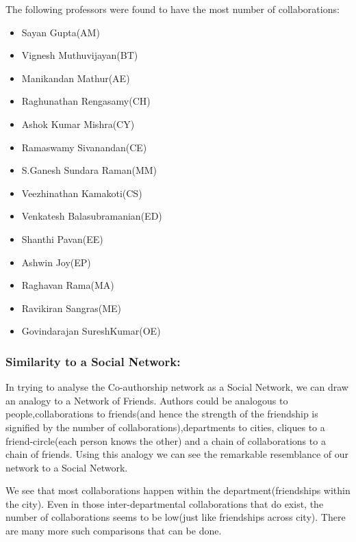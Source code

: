 \documentclass[conference,compsoc]{IEEEtran}
\begin{document}
The following professors were found to have the most number of collaborations: 
\begin{itemize}
\item Sayan Gupta(AM)
\item Vignesh Muthuvijayan(BT)
\item Manikandan Mathur(AE)
\item Raghunathan  Rengasamy(CH)
\item Ashok Kumar Mishra(CY)
\item Ramaswamy Sivanandan(CE)
\item S.Ganesh Sundara Raman(MM)
\item Veezhinathan  Kamakoti(CS)
\item Venkatesh Balasubramanian(ED)
\item Shanthi  Pavan(EE)
\item Ashwin Joy(EP)
\item Raghavan Rama(MA)
\item Ravikiran  Sangras(ME)
\item Govindarajan SureshKumar(OE)
\end{itemize}

\subsubsection*{Similarity to a Social Network:}
In trying to analyse the Co-authorship network as a Social Network, we can draw an analogy to a Network of Friends. Authors could be analogous to people,collaborations to friends(and hence the strength of the friendship is signified by the number of collaborations),departments to cities, cliques to a friend-circle(each person knows the other) and a chain of collaborations to a chain of friends. Using this analogy we can see the remarkable resemblance of our network to a Social Network.

We see that most collaborations happen within the department(friendships within the city). Even in those inter-departmental collaborations that do exist, the number of collaborations seems to be low(just like friendships across city). There are many more such comparisons that can be done. 
\end{document}
